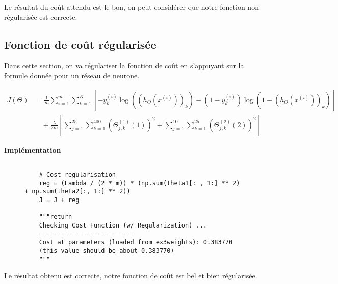 Le résultat du coût attendu est le bon, on peut considérer que notre fonction non régularisée est correcte. 

\clearpage

\subsection{Fonction de coût régularisée}

Dans cette section, on va régulariser la fonction de coût en s'appuyant 
sur la formule donnée pour un réseau de neurone. 

\begin{align}
    J(\Theta) &= \frac{1}{m} \sum_{i=1}^{m} \sum_{k=1}^{K} \left[ -y_k^{(i)} \log((h_\Theta(x^{(i)}))_{k}) - (1 - y_k^{(i)}) \log(1 - (h_\Theta(x^{(i)}))_{k}) \right] \nonumber \\
    &\quad + \frac{\lambda}{2m} \left[ \sum_{j=1}^{25} \sum_{k=1}^{400} (\Theta^{(1)}_{j,k}(1))^2 + \sum_{j=1}^{10} \sum_{k=1}^{25} (\Theta^{(2)}_{j,k}(2))^2 \right]
\end{align}

\noindent
\textbf{Implémentation}

\begin{figure}[!h]
    \begin{verbatim}

    # Cost regularisation
    reg = (Lambda / (2 * m)) * (np.sum(theta1[: , 1:] ** 2) + np.sum(theta2[:, 1:] ** 2))
    J = J + reg

    """return 
    Checking Cost Function (w/ Regularization) ...
    -------------------------- 
    Cost at parameters (loaded from ex3weights): 0.383770 
    (this value should be about 0.383770)      
    """
    \end{verbatim}   
\end{figure}


    Le résultat obtenu est correcte, notre fonction de coût est bel et bien régularisée. 

    




    





